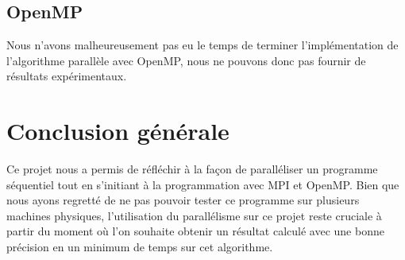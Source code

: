 \documentclass[a4paper,10pt]{article}
\begin{document}
\subsection{OpenMP}

Nous n'avons malheureusement pas eu le temps de terminer l'implémentation de l'algorithme parallèle avec OpenMP,  nous ne pouvons donc pas fournir de résultats expérimentaux. \\


\newpage
\section{Conclusion générale}
Ce projet nous a permis de réfléchir à la façon de paralléliser un programme séquentiel tout en s'initiant à la programmation avec MPI et OpenMP. 
Bien que nous ayons regretté de ne pas pouvoir tester ce programme 
sur plusieurs machines physiques, l'utilisation du parallélisme sur ce projet 
reste cruciale à partir du moment où l'on souhaite obtenir un résultat calculé
avec une bonne précision en un minimum de temps sur cet algorithme. 
\end{document}
